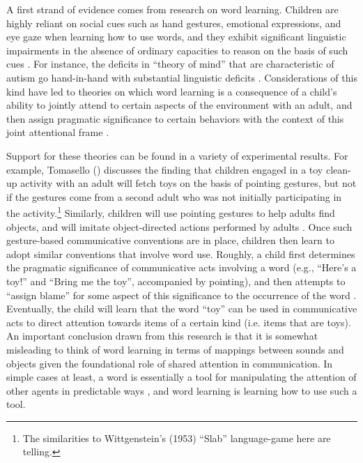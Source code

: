 A first strand of evidence comes from research on word learning. Children are highly reliant on social cues such as hand gestures, emotional expressions, and eye gaze when learning how to use words, and they exhibit significant linguistic impairments in the absence of ordinary capacities to reason on the basis of such cues \citep[][p. 1099-1100]{Bloom:2001}. For instance, the deficits in ``theory of mind'' that are characteristic of autism go hand-in-hand with substantial linguistic deficits \citep{Bloom:2001,Miller:2006,Harley:2014}. Considerations of this kind have led to theories on which word learning is a consequence of a child's ability to jointly attend to certain aspects of the environment with an adult, and then assign pragmatic significance to certain behaviors with the context of this joint attentional frame \citep{Tomasello:2005,Miller:2006}. 

Support for these theories can be found in a variety of experimental results. For example, Tomasello (\citeyear{Tomasello:2005}) discusses the finding that children engaged in a toy clean-up activity with an adult will fetch toys on the basis of pointing gestures, but not if the gestures come from a second adult who was not initially participating in the activity.\footnote{The similarities to Wittgenstein's (1953) ``Slab'' language-game here are telling.} Similarly, children will use pointing gestures to help adults find objects, and will imitate object-directed actions performed by adults \citep{Tomasello:2001}. Once such gesture-based communicative conventions are in place, children then learn to adopt similar conventions that involve word use. Roughly, a child first determines the pragmatic significance of communicative acts involving a word (e.g., ``Here's a toy!'' and ``Bring me the toy'', accompanied by pointing), and then attempts to ``assign blame'' for some aspect of this significance to the occurrence of the word \citep[][p. 73]{Tomasello:2005}. Eventually, the child will learn that the word ``toy'' can be used in communicative acts to direct attention towards items of a certain kind (i.e. items that are toys). An important conclusion drawn from this research is that it is somewhat misleading to think of word learning in terms of mappings between sounds and objects given the foundational role of shared attention in communication. In simple cases at least, a word is essentially a tool for manipulating the attention of other agents in predictable ways \citep{Tomasello:2001}, and word learning is learning how to use such a tool. 

